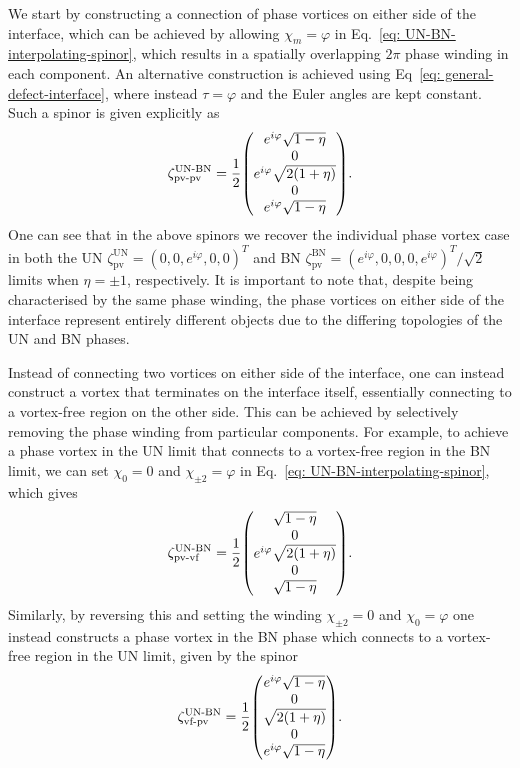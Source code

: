 We start by constructing a connection of phase vortices on either side of the
interface, which can be achieved by allowing \(\chi_m=\varphi \) in
Eq.~\eqref{eq: UN-BN-interpolating-spinor}, which results in a spatially
overlapping \(2\pi \) phase winding in each component.
An alternative construction is achieved using
Eq~\eqref{eq: general-defect-interface}, where instead \(\tau=\varphi \) and the
Euler angles are kept constant.
Such a spinor is given explicitly as
\begin{align}\label{eq: UN-BN-SQV-SQV}
    \zeta_\text{pv-pv}^\text{UN-BN} =
    \frac{1}{2}\mqty(
        e^{i\varphi}\sqrt{1-\eta} \\
        0 \\
        e^{i\varphi}\sqrt{2(1+\eta)} \\
        0 \\
        e^{i\varphi}\sqrt{1-\eta}
    ).
\end{align}
One can see that in the above spinors we recover the individual phase vortex
case in both the UN \(\zeta^\text{UN}_\text{pv} = {(0,0,e^{i\varphi},0,0)}^T\)
and BN \(\zeta^\mathrm{BN}_\text{pv} =
{(e^{i\varphi},0,0,0,e^{i\varphi})}^T/\sqrt{2}\) limits when \(\eta = \pm 1\),
respectively.
It is important to note that, despite being characterised by the same phase
winding, the phase vortices on either side of the interface represent entirely
different objects due to the differing topologies of the UN and BN phases.

Instead of connecting two vortices on either side of the interface, one can
instead construct a vortex that terminates on the interface itself, essentially
connecting to a vortex-free region on the other side.
This can be achieved by selectively removing the phase winding from particular
components.
For example, to achieve a phase vortex in the UN limit that connects to a
vortex-free region in the BN limit, we can set \(\chi_0 = 0\) and \(\chi_{\pm 2}
= \varphi \) in Eq.~\eqref{eq: UN-BN-interpolating-spinor}, which gives
\begin{align}\label{eq: UN-BN-pv-vf}
    \zeta^\text{UN-BN}_\text{pv-vf} = \frac{1}{2}\mqty(
        \sqrt{1-\eta} \\
        0 \\
        e^{i\varphi} \sqrt{2(1+\eta)} \\
        0 \\
        \sqrt{1-\eta}
    ).
\end{align}
Similarly, by reversing this and setting the winding \(\chi_{\pm 2} = 0\) and
\(\chi_0=\varphi \) one instead constructs a phase vortex in the BN phase which
connects to a vortex-free region in the UN limit, given by the spinor
\begin{align}\label{eq: UN-BN-vf-pv}
    \zeta^\text{UN-BN}_\text{vf-pv} = \frac{1}{2}\mqty(
        e^{i\varphi} \sqrt{1-\eta} \\
        0 \\
        \sqrt{2(1+\eta)} \\
        0 \\
        e^{i\varphi} \sqrt{1-\eta}
    ).
\end{align}

